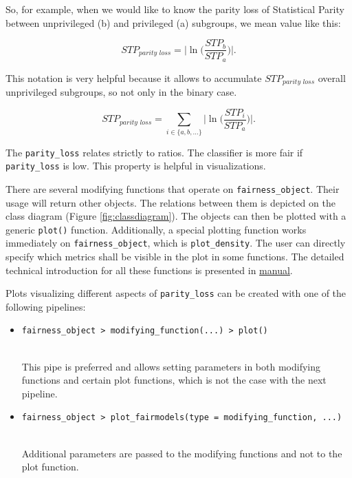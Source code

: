 So, for example, when we would like to know the parity loss of
Statistical Parity between unprivileged (b) and privileged (a)
subgroups, we mean value like this:

\begin{equation} 
STP_{\textit{parity loss}} = \Big | \ln \Big( \frac{STP_b}{STP_a} \Big)\Big|. 
\end{equation}

This notation is very helpful because it allows to accumulate
\(STP_{\textit{parity loss}}\) overall unprivileged subgroups, so not
only in the binary case.

\begin{equation} 
STP_{\textit{parity loss}} = \sum_{i \in \{a, b, ...\}} \Big|\ln \Big(\frac{STP_i}{STP_a} \Big)\Big|.  
  \label{eq:parityLoss}
\end{equation}

The \texttt{parity\_loss} relates strictly to ratios. The classifier is
more fair if \texttt{parity\_loss} is low. This property is helpful in
visualizations.

There are several modifying functions that operate on
\texttt{fairness\_object}. Their usage will return other objects. The
relations between them is depicted on the class diagram (Figure
\ref{fig:classdiagram}). The objects can then be plotted with a generic
\texttt{plot()} function. Additionally, a special plotting function
works immediately on \texttt{fairness\_object}, which is
\texttt{plot\_density}. The user can directly specify which metrics
shall be visible in the plot in some functions. The detailed technical
introduction for all these functions is presented in
\href{https://cran.r-project.org/web/packages/fairmodels/fairmodels.pdf}{ manual}.

\clearpage

Plots visualizing different aspects of \texttt{parity\_loss} can be
created with one of the following pipelines:

\begin{itemize}
\tightlist
\item
  \texttt{fairness\_object\ \textbar{}\textgreater{}\ modifying\_function(...)\ \textbar{}\textgreater{}\ plot()}\strut \\
  This pipe is preferred and allows setting parameters in both modifying
  functions and certain plot functions, which is not the case with the
  next pipeline.
\item
  \texttt{fairness\_object\ \textbar{}\textgreater{}\ plot\_fairmodels(type\ =\ modifying\_function,\ ...)}\strut \\
  Additional parameters are passed to the modifying functions and not to
  the plot function.
\end{itemize}

